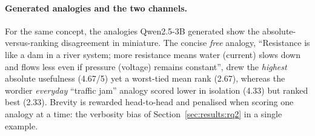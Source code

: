 \documentclass[11pt]{article}
\begin{document}
\paragraph{Generated analogies and the two channels.} For the same concept, the analogies
Qwen2.5-3B generated show the absolute-versus-ranking disagreement in miniature. The concise
\emph{free} analogy, ``Resistance is like a dam in a river system; more resistance means
water (current) slows down and flows less even if pressure (voltage) remains constant'', drew
the \emph{highest} absolute usefulness (4.67/5) yet a worst-tied mean rank (2.67), whereas the
wordier \emph{everyday} ``traffic jam'' analogy scored lower in isolation (4.33) but ranked
best (2.33). Brevity is rewarded head-to-head and penalised when scoring one analogy at a
time: the verbosity bias of Section~\ref{sec:results:rq2} in a single example.
\end{document}
